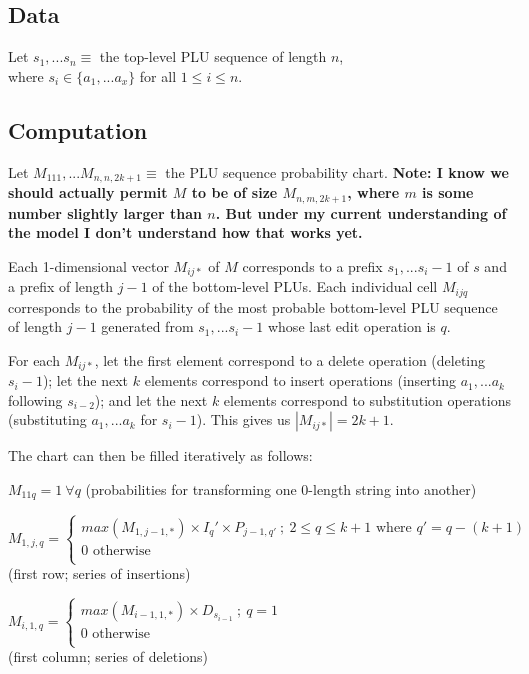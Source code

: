 \documentclass[11pt]{article}
\begin{document}
\subsection{Data}

Let $s_1, ... s_n \equiv$ the top-level PLU sequence of length $n$, \\ where $s_i \in \{a_1, ... a_x\}$ for all $1\leq i\leq n$.

\subsection{Computation}

Let $M_{111}, ... M_{n,n,2k+1} \equiv$ the PLU sequence probability chart. \textbf{Note: I know we should actually permit $M$ to be of size $M_{n,m,2k+1}$, where $m$ is some number slightly larger than $n$. But under my current understanding of the model I don't understand how that works yet.}


Each 1-dimensional vector $M_{ij*}$ of $M$ corresponds to a prefix $s_1, ... s_i-1$ of $s$ and a prefix of length $j-1$ of the bottom-level PLUs. Each individual cell $M_{ijq}$ corresponds to the probability of the most probable bottom-level PLU sequence of length $j-1$ generated from $s_1, ... s_i-1$ whose last edit operation is $q$.

For each $M_{ij*}$, let the first element correspond to a delete operation (deleting $s_i-1$); let the next $k$ elements correspond to insert operations (inserting $a_1, ... a_k$ following $s_{i-2}$); and let the next $k$ elements correspond to substitution operations (substituting $a_1, ... a_k$ for $s_i-1$). This gives us $|M_{ij*}|=2k+1$.

The chart can then be filled iteratively as follows:


$M_{11q} = 1 ~\forall q$ \hfill (probabilities for transforming one 0-length string into another)


$M_{1,j,q} = \begin{cases}
		{max}(M_{1,j-1,*}) \times I_q' \times P_{j-1,q'} ~;~ 2\leq q\leq k+1 \text{ where } q'=q-(k+1) \\
		0 \text{ otherwise} \\
		\end{cases}$ \\\-\hfill (first row; series of insertions)

$M_{i,1,q} = \begin{cases}
		{max}(M_{i-1,1,*}) \times D_{s_{i-1}} ~;~ q=1 \\
		0 \text{ otherwise} \\
		\end{cases}$ \\\-\hfill (first column; series of deletions)
		
\end{document}
